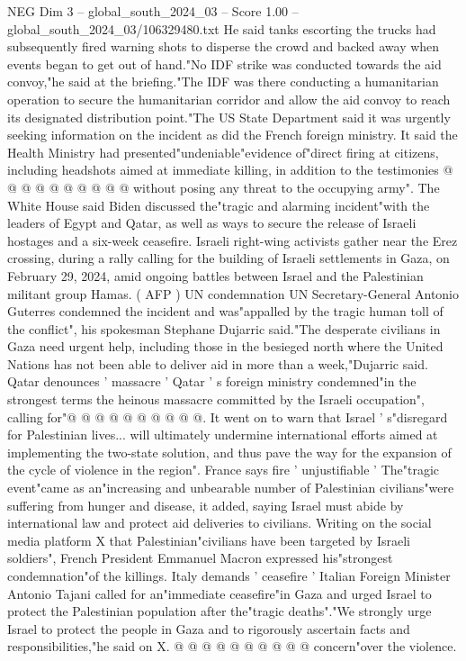 \begin{textsample}{NEG Dim 3 – global\_south\_2024\_03 – Score 1.00 – global\_south\_2024\_03/106329480.txt}
He said tanks escorting the trucks had subsequently fired warning shots to disperse the crowd and backed away when events began to get out of hand."No IDF strike was conducted towards the aid convoy,"he said at the briefing."The IDF was there conducting a humanitarian operation to secure the humanitarian corridor and allow the aid convoy to reach its designated distribution point."The US State Department said it was urgently seeking information on the incident as did the French foreign ministry.
It said the Health Ministry had presented"undeniable"evidence of"direct firing at citizens, including headshots aimed at immediate killing, in addition to the testimonies @ @ @ @ @ @ @ @ @ @ without posing any threat to the occupying army".
The White House said Biden discussed the"tragic and alarming incident"with the leaders of Egypt and Qatar, as well as ways to secure the release of Israeli hostages and a six-week ceasefire.
Israeli right-wing activists gather near the Erez crossing, during a rally calling for the building of Israeli settlements in Gaza, on February 29, 2024, amid ongoing battles between Israel and the Palestinian militant group Hamas. ( AFP ) UN condemnation UN Secretary-General Antonio Guterres condemned the incident and was"appalled by the tragic human toll of the conflict", his spokesman Stephane Dujarric said."The desperate civilians in Gaza need urgent help, including those in the besieged north where the United Nations has not been able to deliver aid in more than a week,"Dujarric said.
Qatar denounces ' massacre ' Qatar ' s foreign ministry condemned"in the strongest terms the heinous massacre committed by the Israeli occupation", calling for"@ @ @ @ @ @ @ @ @ @.
It went on to warn that Israel ' s"disregard for Palestinian lives... will ultimately undermine international efforts aimed at implementing the two-state solution, and thus pave the way for the expansion of the cycle of violence in the region".
France says fire ' unjustifiable ' The"tragic event"came as an"increasing and unbearable number of Palestinian civilians"were suffering from hunger and disease, it added, saying Israel must abide by international law and protect aid deliveries to civilians.
Writing on the social media platform X that Palestinian"civilians have been targeted by Israeli soldiers", French President Emmanuel Macron expressed his"strongest condemnation"of the killings.
Italy demands ' ceasefire ' Italian Foreign Minister Antonio Tajani called for an"immediate ceasefire"in Gaza and urged Israel to protect the Palestinian population after the"tragic deaths"."We strongly urge Israel to protect the people in Gaza and to rigorously ascertain facts and responsibilities,"he said on X. @ @ @ @ @ @ @ @ @ @ concern"over the violence.

\end{textsample}
